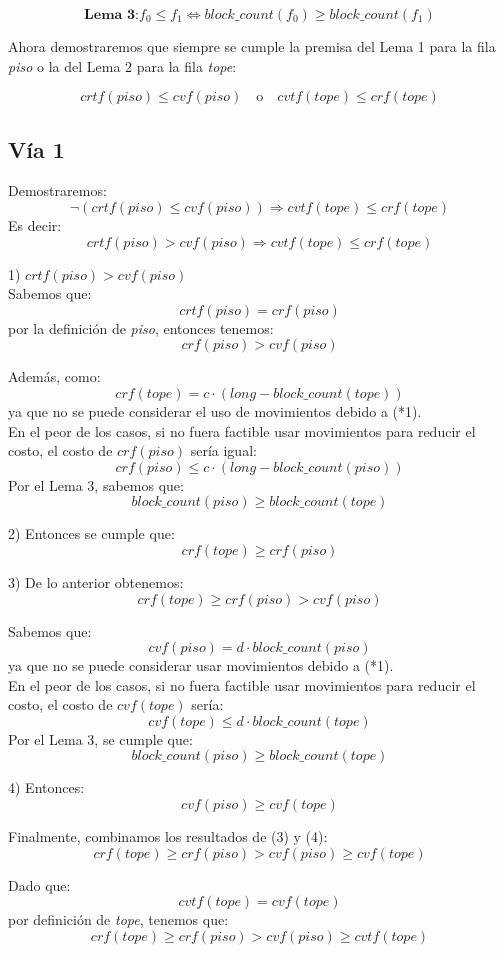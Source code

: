 \documentclass[a4paper,12pt]{article}
\begin{document}
\[
\textbf{Lema 3:} f_0 \leq f_1 \iff \textit{block\_count}(f_0) \geq \textit{block\_count}(f_1)
\]

Ahora demostraremos que siempre se cumple la premisa del Lema 1 para la fila \textit{piso} o la del Lema 2 para la fila \textit{tope}:

\[
crtf(piso) \leq cvf(piso) \quad \text{o} \quad cvtf(tope) \leq crf(tope)
\]

\subsection{Vía 1}
Demostraremos:
\[
\neg \left( crtf(piso) \leq cvf(piso) \right) \Rightarrow cvtf(tope) \leq crf(tope)
\]
Es decir:
\[
crtf(piso) > cvf(piso) \Rightarrow cvtf(tope) \leq crf(tope)
\]

1) $crtf(piso) > cvf(piso)$\\
Sabemos que:
\[
crtf(piso) = crf(piso)
\]
por la definición de \textit{piso}, entonces tenemos:
\[
crf(piso) > cvf(piso)
\]

Además, como:
\[
crf(tope) = c \cdot (long - \textit{block\_count}(tope))
\]
ya que no se puede considerar el uso de movimientos debido a (*1).\\
En el peor de los casos, si no fuera factible usar movimientos para reducir el costo, el costo de $crf(piso)$ sería igual:
\[
crf(piso) \leq c \cdot (long - \textit{block\_count}(piso))
\]
Por el Lema 3, sabemos que:
\[
\textit{block\_count}(piso) \geq \textit{block\_count}(tope)
\]

2) Entonces se cumple que:
\[
crf(tope) \geq crf(piso)
\]

3) De lo anterior obtenemos:
\[
crf(tope) \geq crf(piso) > cvf(piso)
\]

Sabemos que:
\[
cvf(piso) = d \cdot \textit{block\_count}(piso)
\]
ya que no se puede considerar usar movimientos debido a (*1).\\
En el peor de los casos, si no fuera factible usar movimientos para reducir el costo, el costo de $cvf(tope)$ sería:
\[
cvf(tope) \leq d \cdot \textit{block\_count}(tope)
\]
Por el Lema 3, se cumple que:
\[
\textit{block\_count}(piso) \geq \textit{block\_count}(tope)
\]

4) Entonces:
\[
cvf(piso) \geq cvf(tope)
\]

Finalmente, combinamos los resultados de (3) y (4):
\[
crf(tope) \geq crf(piso) > cvf(piso) \geq cvf(tope)
\]

Dado que:
\[
cvtf(tope) = cvf(tope)
\]
por definición de \textit{tope}, tenemos que:
\[
crf(tope) \geq crf(piso) > cvf(piso) \geq cvtf(tope)
\]
\end{document}
